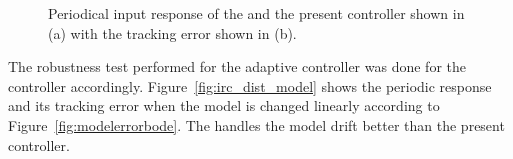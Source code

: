 \begin{figure}[h!]
  \centering %
  \qquad
  \caption{\label{fig:irc_tracking} Periodical input response of the \abbrIRC and the present controller shown in (a) with the tracking error shown in (b).}
\end{figure}

The robustness test performed for the adaptive controller was done for the \abbrIRC controller accordingly. Figure~\ref{fig:irc_dist_model} shows the periodic response and its tracking error when the model is changed linearly according to Figure~\ref{fig:modelerrorbode}. The \abbrIRC handles the model drift better than the present controller.

